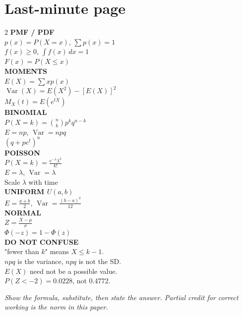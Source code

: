 \documentclass[11pt,a4paper]{article}
\begin{document}
\section{Last-minute page}

\begin{multicols}{2}
\textbf{PMF / PDF}\\
$p(x)=P(X=x)$, $\sum p(x)=1$\\
$f(x)\ge 0$, $\int f(x)\,dx=1$\\
$F(x)=P(X\le x)$\\[4pt]
\textbf{MOMENTS}\\
$E(X)=\sum xp(x)$\\
$\operatorname{Var}(X)=E(X^2)-[E(X)]^2$\\
$M_X(t)=E(e^{tX})$\\[4pt]
\textbf{BINOMIAL}\\
$P(X=k)=\binom nk p^kq^{n-k}$\\
$E=np$, $\operatorname{Var}=npq$\\
$(q+pe^t)^n$\\[4pt]
\textbf{POISSON}\\
$P(X=k)=\frac{e^{-\lambda}\lambda^k}{k!}$\\
$E=\lambda$, $\operatorname{Var}=\lambda$\\
Scale $\lambda$ with time\\[4pt]
\textbf{UNIFORM $U(a,b)$}\\
$E=\frac{a+b}{2}$, $\operatorname{Var}=\frac{(b-a)^2}{12}$\\[4pt]
\textbf{NORMAL}\\
$Z=\frac{X-\mu}{\sigma}$\\
$\Phi(-z)=1-\Phi(z)$\\[4pt]
\textbf{DO NOT CONFUSE}\\
"fewer than $k$" means $X\le k-1$.\\
$npq$ is the variance, $npq$ is not the SD.\\
$E(X)$ need not be a possible value.\\
$P(Z<-2)=0.0228$, not 0.4772.
\end{multicols}

\vfill
\begin{center}\textit{Show the formula, substitute, then state the answer. Partial credit for correct working is the norm in this paper.}\end{center}
\end{document}
